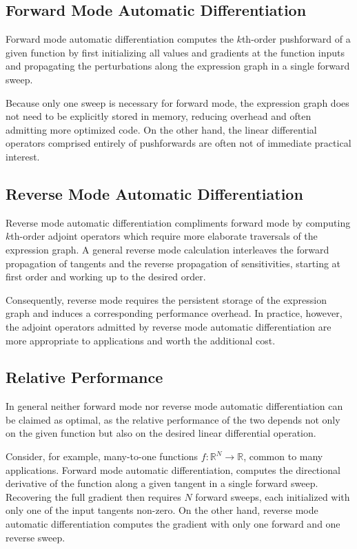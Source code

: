 \subsection{Forward Mode Automatic Differentiation}

Forward mode automatic differentiation computes the $k$th-order pushforward 
of a given function by first initializing all values and gradients at the function
inputs and propagating the perturbations along the expression graph in a single 
forward sweep.  

Because only one sweep is necessary for forward mode, the expression graph does 
not need to be explicitly stored in memory, reducing overhead and often admitting 
more optimized code.  On the other hand, the linear differential operators comprised 
entirely of pushforwards are often not of immediate practical interest.

\subsection{Reverse Mode Automatic Differentiation}

Reverse mode automatic differentiation compliments forward mode by computing
$k$th-order adjoint operators which require more elaborate traversals of the
expression graph.  A general reverse mode calculation interleaves the forward
propagation of tangents and the reverse propagation of sensitivities, starting at
first order and working up to the desired order.

Consequently, reverse mode requires the persistent storage of the expression 
graph and induces a corresponding performance overhead.  In practice, however,
the adjoint operators admitted by reverse mode automatic differentiation are
more appropriate to applications and worth the additional cost.

\subsection{Relative Performance}

In general neither forward mode nor reverse mode automatic differentiation can be
claimed as optimal, as the relative performance of the two depends not only on
the given function but also on the desired linear differential operation.  

Consider, for example, many-to-one functions $f : \mathbb{R}^{N} \rightarrow \mathbb{R}$,
common to many applications.  Forward mode automatic differentiation, computes the 
directional derivative of the function along a given tangent in a single forward sweep.
Recovering the full gradient then requires $N$ forward sweeps, each initialized with
only one of the input tangents non-zero.  On the other hand, reverse mode automatic
differentiation computes the gradient with only one forward and one reverse sweep.  

